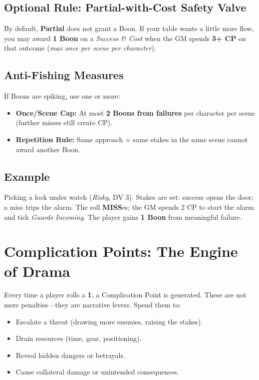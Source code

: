 \subsection{Optional Rule: Partial-with-Cost Safety Valve}
By default, \textbf{Partial} does not grant a Boon. If your table wants a little more flow, you may award \textbf{1 Boon} on a \emph{Success \& Cost} when the GM spends \textbf{3+ CP} on that outcome (\emph{max once per scene per character}).

\subsection{Anti-Fishing Measures}
If Boons are spiking, use one or more:
\begin{itemize}
  \item \textbf{Once/Scene Cap:} At most \textbf{2 Boons from failures} per character per scene (further misses still create CP).
  \item \textbf{Repetition Rule:} Same approach + same stakes in the same scene cannot award another Boon.
\end{itemize}

\subsection{Example}
Picking a lock under watch (\emph{Risky}, DV 3). Stakes are set: success opens the door; a miss trips the alarm. The roll \textbf{MISS}es; the GM spends 2 CP to start the alarm and tick \emph{Guards Incoming}. The player gains \textbf{1 Boon} from meaningful failure.

\section{Complication Points: The Engine of Drama}

Every time a player rolls a \textbf{1}, a Complication Point is generated. These are not mere penalties---they are narrative levers. Spend them to:

\begin{itemize}
    \item Escalate a threat (drawing more enemies, raising the stakes).
    \item Drain resources (time, gear, positioning).
    \item Reveal hidden dangers or betrayals.
    \item Cause collateral damage or unintended consequences.
\end{itemize}

